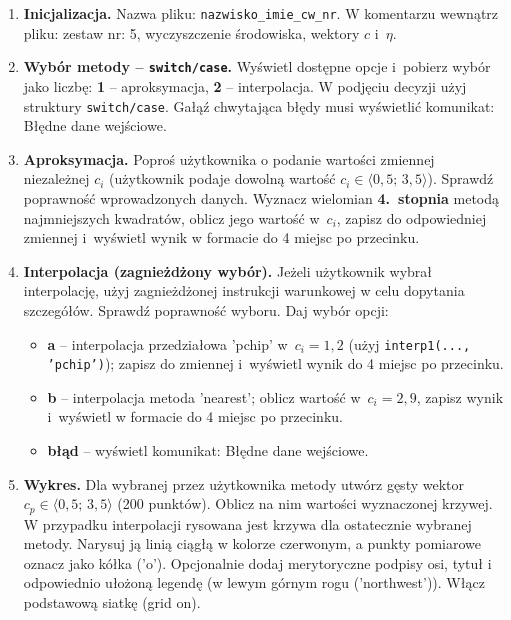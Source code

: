 \documentclass[a4paper,11pt]{article}
\begin{document}
\begin{enumerate}[leftmargin=*, label=\textbf{\arabic*.}, itemsep=2pt]

  \item \textbf{Inicjalizacja.}
    Nazwa pliku: \texttt{nazwisko\_imie\_cw\_nr}. W komentarzu wewnątrz pliku: zestaw nr: 5, wyczyszczenie środowiska, wektory $c$ i~$\eta$.

  \item \textbf{Wybór metody -- \texttt{switch/case}.}
    Wyświetl dostępne opcje i~pobierz wybór jako liczbę: \textbf{1} -- aproksymacja, \textbf{2} -- interpolacja. W podjęciu decyzji użyj struktury \texttt{switch/case}. Gałąź chwytająca błędy musi wyświetlić komunikat: Błędne dane wejściowe.

  \item \textbf{Aproksymacja.}
    Poproś użytkownika o podanie wartości zmiennej niezależnej $c_i$ (użytkownik podaje dowolną wartość $c_i \in \langle 0{,}5;\,3{,}5 \rangle$). Sprawdź poprawność wprowadzonych danych. Wyznacz wielomian \textbf{4.~stopnia} metodą najmniejszych kwadratów, oblicz jego wartość w~$c_i$, zapisz do odpowiedniej zmiennej i~wyświetl wynik w formacie do 4 miejsc po przecinku.

  \item \textbf{Interpolacja (zagnieżdżony wybór).}
    Jeżeli użytkownik wybrał interpolację, użyj zagnieżdżonej instrukcji warunkowej w celu dopytania szczegółów. Sprawdź poprawność wyboru. Daj wybór opcji:
    \begin{itemize}[itemsep=1pt]
      \item \textbf{a} -- interpolacja przedziałowa 'pchip' w~$c_i = 1{,}2$ (użyj \texttt{interp1(..., 'pchip')}); zapisz do zmiennej i~wyświetl wynik do 4 miejsc po przecinku.
      \item \textbf{b} -- interpolacja metoda 'nearest'; oblicz wartość w~$c_i = 2{,}9$, zapisz wynik i~wyświetl w formacie do 4 miejsc po przecinku.
      \item \textbf{błąd} -- wyświetl komunikat: Błędne dane wejściowe.
    \end{itemize}

  \item \textbf{Wykres.}
    Dla wybranej przez użytkownika metody utwórz gęsty wektor $c_p \in \langle 0{,}5;\,3{,}5 \rangle$ (200 punktów). Oblicz na nim wartości wyznaczonej krzywej. W przypadku interpolacji rysowana jest krzywa dla ostatecznie wybranej metody. Narysuj ją linią ciągłą w kolorze czerwonym, a punkty pomiarowe oznacz jako kółka ('o'). Opcjonalnie dodaj merytoryczne podpisy osi, tytuł i odpowiednio ułożoną legendę (w lewym górnym rogu ('northwest')). Włącz podstawową siatkę (grid on).

\end{enumerate}
\end{document}
